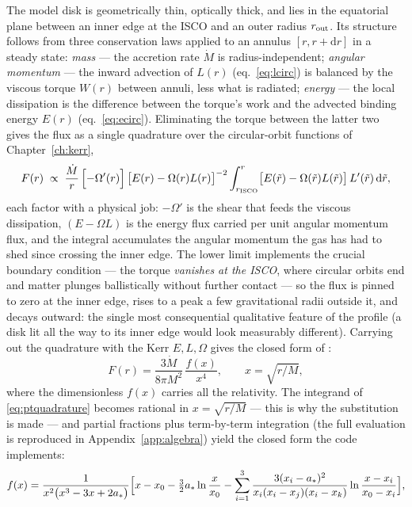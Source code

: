The model disk is geometrically thin, optically thick, and lies in the
equatorial plane between an inner edge at the ISCO and an outer radius
$r_{\rm out}$. Its structure follows from three conservation laws
applied to an annulus $[r, r+\mathrm{d}r]$ in a steady state:
\emph{mass} — the accretion rate $\dot M$ is radius-independent;
\emph{angular momentum} — the inward advection of $L(r)$
(eq.~\ref{eq:lcirc}) is balanced by the viscous torque $W(r)$ between
annuli, less what is radiated; \emph{energy} — the local dissipation is
the difference between the torque's work and the advected binding
energy $E(r)$ (eq.~\ref{eq:ecirc}). Eliminating the torque between the
latter two gives the flux as a single quadrature over the
circular-orbit functions of Chapter~\ref{ch:kerr},
\begin{equation}
F(r) \;\propto\; \frac{\dot M}{r}\,
\Bigl[-\Omega'(r)\Bigr]\,
\bigl[E(r) - \Omega(r) L(r)\bigr]^{-2}
\int_{r_{\rm ISCO}}^{r}
\bigl[E(\tilde r) - \Omega(\tilde r)L(\tilde r)\bigr]\,
L'(\tilde r)\,\mathrm{d}\tilde r ,
\label{eq:ptquadrature}
\end{equation}
each factor with a physical job: $-\Omega'$ is the shear that feeds
the viscous dissipation, $(E - \Omega L)$ is the energy flux carried
per unit angular momentum flux, and the integral accumulates the
angular momentum the gas has had to shed since crossing the inner
edge. The lower limit implements the crucial boundary condition — the
torque \emph{vanishes at the ISCO}, where circular orbits end and
matter plunges ballistically without further contact — so the flux is
pinned to zero at the inner edge, rises to a peak a few gravitational
radii outside it, and decays outward: the single most consequential
qualitative feature of the profile (a disk lit all the way to its
inner edge would look measurably different). Carrying out the
quadrature with the Kerr $E, L, \Omega$ gives the closed form of
\citet[eq.~15n]{PageThorne1974}:
\begin{equation}
F(r) = \frac{3\dot M}{8\pi M^2}\,\frac{f(x)}{x^4},
\qquad x = \sqrt{r/M},
\label{eq:ptflux}
\end{equation}
where the dimensionless $f(x)$ carries all the relativity. The
integrand of \eqref{eq:ptquadrature} becomes rational in
$x = \sqrt{r/M}$ — this is why the substitution is made — and partial
fractions plus term-by-term integration (the full evaluation is
reproduced in Appendix~\ref{app:algebra}) yield the closed form the
code implements:
\begin{equation}
f(x) = \frac{1}{x^{2}\bigl(x^3 - 3x + 2a_*\bigr)}
\Bigl[x - x_0 - \tfrac{3}{2}a_*\ln\frac{x}{x_0}
- \sum_{i=1}^{3}
\frac{3(x_i-a_*)^2}{x_i(x_i-x_j)(x_i-x_k)}
\ln\frac{x-x_i}{x_0-x_i}\Bigr],
\label{eq:pagethorne}
\end{equation}

